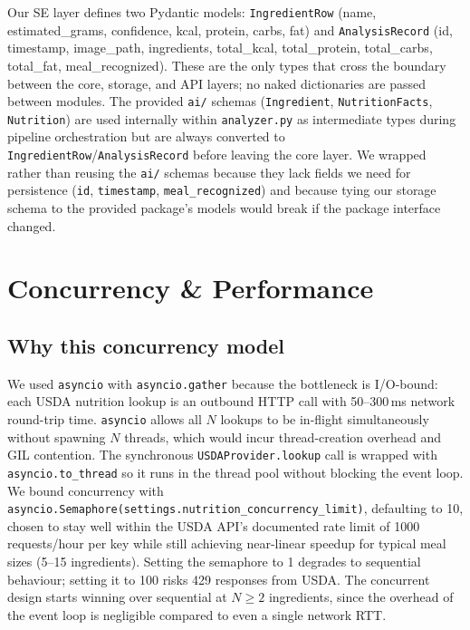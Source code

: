 \documentclass[11pt,a4paper]{article}
\begin{document}
Our SE layer defines two Pydantic models: \texttt{IngredientRow} (name, estimated\_grams, confidence, kcal, protein, carbs, fat) and \texttt{AnalysisRecord} (id, timestamp, image\_path, ingredients, total\_kcal, total\_protein, total\_carbs, total\_fat, meal\_recognized). These are the only types that cross the boundary between the core, storage, and API layers; no naked dictionaries are passed between modules. The provided \texttt{ai/} schemas (\texttt{Ingredient}, \texttt{NutritionFacts}, \texttt{Nutrition}) are used internally within \texttt{analyzer.py} as intermediate types during pipeline orchestration but are always converted to \texttt{IngredientRow}/\texttt{AnalysisRecord} before leaving the core layer. We wrapped rather than reusing the \texttt{ai/} schemas because they lack fields we need for persistence (\texttt{id}, \texttt{timestamp}, \texttt{meal\_recognized}) and because tying our storage schema to the provided package's models would break if the package interface changed.

\section{Concurrency \& Performance}\label{sec:concurrency}

\subsection{Why this concurrency model}

We used \texttt{asyncio} with \texttt{asyncio.gather} because the bottleneck is I/O-bound: each USDA nutrition lookup is an outbound HTTP call with 50--300\,ms network round-trip time. \texttt{asyncio} allows all $N$ lookups to be in-flight simultaneously without spawning $N$ threads, which would incur thread-creation overhead and GIL contention. The synchronous \texttt{USDAProvider.lookup} call is wrapped with \texttt{asyncio.to\_thread} so it runs in the thread pool without blocking the event loop. We bound concurrency with \texttt{asyncio.Semaphore(settings.nutrition\_concurrency\_limit)}, defaulting to 10, chosen to stay well within the USDA API's documented rate limit of 1000 requests/hour per key while still achieving near-linear speedup for typical meal sizes (5--15 ingredients). Setting the semaphore to 1 degrades to sequential behaviour; setting it to 100 risks 429 responses from USDA. The concurrent design starts winning over sequential at $N \geq 2$ ingredients, since the overhead of the event loop is negligible compared to even a single network RTT.
\end{document}
